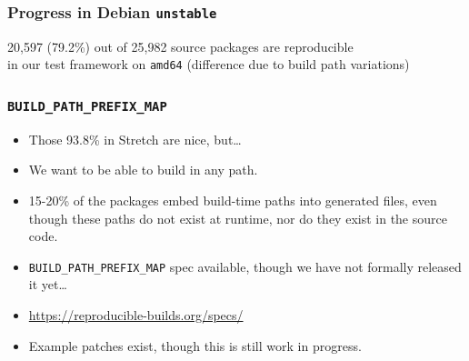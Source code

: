 \documentclass[14pt,aspectratio=169]{beamer}
\begin{document}
\begin{frame}
 \frametitle{Progress in Debian \texttt{unstable}}
 \begin{center}
  \footnotesize{20,597 (79.2\%) out of 25,982 source packages are reproducible \\
    in our test framework on \texttt{amd64}} (difference due to build path variations)
  \vfill
 \end{center}
\end{frame}

\begin{frame}
 \frametitle{\texttt{BUILD\_PATH\_PREFIX\_MAP}}

 \begin{itemize}
  \item Those 93.8\% in Stretch are nice, but…
  \item We want to be able to build in any path.
  \item 15-20\% of the packages embed build-time paths into generated files, even though these paths do not exist at runtime, nor do they exist in the source code.
  \item \texttt{BUILD\_PATH\_PREFIX\_MAP} spec available, though we have not formally released it yet…
  \item \url{https://reproducible-builds.org/specs/}
  \item Example patches exist, though this is still work in progress.
 \end{itemize}
\end{frame}
\end{document}
